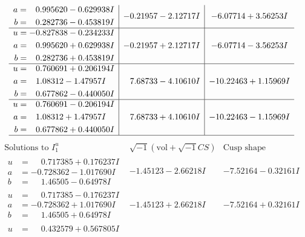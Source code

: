 \documentclass[1p]{elsarticle_modified}
\theoremstyle{definition}
\newcommand{\I}{\sqrt{-1}}
\begin{document}
$$\begin{array}{c|c|c}
\begin{aligned}
a &= \phantom{-}0.995620 - 0.629938 I \\
b &= \phantom{-}0.282736 - 0.453819 I\end{aligned}
 & -0.21957 - 2.12717 I & -6.07714 + 3.56253 I \\ \hline\begin{aligned}
u &= -0.827838 - 0.234233 I \\
a &= \phantom{-}0.995620 + 0.629938 I \\
b &= \phantom{-}0.282736 + 0.453819 I\end{aligned}
 & -0.21957 + 2.12717 I & -6.07714 - 3.56253 I \\ \hline\begin{aligned}
u &= \phantom{-}0.760691 + 0.206194 I \\
a &= \phantom{-}1.08312 - 1.47957 I \\
b &= \phantom{-}0.677862 - 0.440050 I\end{aligned}
 & \phantom{-}7.68733 - 4.10610 I & -10.22463 + 1.15969 I \\ \hline\begin{aligned}
u &= \phantom{-}0.760691 - 0.206194 I \\
a &= \phantom{-}1.08312 + 1.47957 I \\
b &= \phantom{-}0.677862 + 0.440050 I\end{aligned}
 & \phantom{-}7.68733 + 4.10610 I & -10.22463 - 1.15969 I\\
 \hline 
 \end{array}$$\newpage$$\begin{array}{c|c|c}  
\text{Solutions to }I^u_{1}& \I (\text{vol} + \sqrt{-1}CS) & \text{Cusp shape}\\
 \hline 
\begin{aligned}
u &= \phantom{-}0.717385 + 0.176237 I \\
a &= -0.728362 - 1.017690 I \\
b &= \phantom{-}1.46505 - 0.64978 I\end{aligned}
 & -1.45123 - 2.66218 I & -7.52164 - 0.32161 I \\ \hline\begin{aligned}
u &= \phantom{-}0.717385 - 0.176237 I \\
a &= -0.728362 + 1.017690 I \\
b &= \phantom{-}1.46505 + 0.64978 I\end{aligned}
 & -1.45123 + 2.66218 I & -7.52164 + 0.32161 I \\ \hline\begin{aligned}
u &= \phantom{-}0.432579 + 0.567805 I \\

\end{aligned}
\end{array}$$
\end{document}
